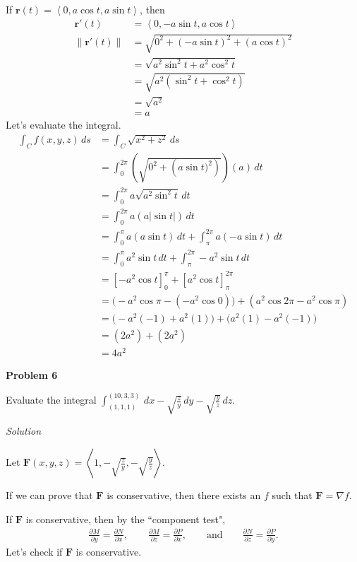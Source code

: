 \documentclass{article}
\newcommand{\lrp}[1]{\left( #1 \right)}
\newcommand{\lra}[1]{\left\langle #1 \right\rangle}
\newcommand{\lrb}[1]{\left[ #1 \right]}
\newcommand{\norm}[1]{\left\lVert #1 \right\rVert}
\renewcommand{\r}[0]{\mathbf{r}}
\newcommand{\F}[0]{\mathbf{F}}
\newcommand{\Solution}{\textit{Solution}}
\begin{document}
If $\r(t)=\lra{0,a\cos t,a\sin t}$, then
\begin{align*}
    \r'(t)&=\lra{0,-a\sin t, a\cos t}\\
    \norm{\r'(t)}&=\sqrt{0^2 + \lrp{-a\sin t}^2 +\lrp{a \cos t}^2}\\
    &=\sqrt{a^2\sin ^2 t+a^2\cos ^2 t}\\
    &=\sqrt{a^2\lrp{\sin ^2 t+\cos ^2 t}}\\
    &=\sqrt{a^2}\tag{$\sin ^2 t+\cos ^2 t=1$}\\
    &=a\tag{not $\left|a\right|$ since $a$ is radius of circle}
\end{align*}
Let's evaluate the integral.
\begin{align*}
    \int_C f(x,y,z)\,ds&=\int_C \sqrt{x^2+z^2}\,ds\\
    &=\int_0^{2\pi}\lrp{\sqrt{0^2+\lrp{a\sin t)^2}}}\lrp{a}\,dt\\
    &=\int_0^{2\pi}a\sqrt{a^2\sin^2 t}\,dt\\
    &=\int_0^{2\pi}a\lrp{a\left|\sin t\right|}\,dt\\
    &= \int_0^{\pi}a\lrp{a\sin t}\,dt+\int_{\pi}^{2\pi}a\lrp{-a\sin t}\,dt\tag{$\sin t\geq0$ when $0\leq t\leq \pi$, $\sin t\leq0$ when $\pi \leq t\leq 2\pi$}\\
    &=\int_0^\pi a^2\sin t\,dt+\int_{\pi}^{2\pi}-a^2\sin t\,dt\\
    &=\lrb{-a^2\cos t}_0^{\pi}+\lrb{a^2\cos t}_{\pi}^{2\pi}\\
    &=\Big(-a^2\cos \pi-\lrp{-a^2\cos 0}\Big)+\lrp{a^2\cos 2\pi -a^2\cos \pi}\\
    &=\Big(-a^2\lrp{-1}+a^2\lrp{1}\big)+\Big(a^2(1)-a^2(-1)\Big)\\
    &=\lrp{2a^2}+\lrp{2a^2}\\
    &=\boxed{4a^2}
\end{align*}

{}\textbf{Problem 6}

Evaluate the integral $\displaystyle \int_{(1,1,1)}^{(10,3,3)}\,dx-\sqrt{\frac{z}{y}}\,dy-\sqrt{\frac{y}{z}}\,dz$.

\Solution

Let $\displaystyle\F(x,y,z)=\lra{1,-\sqrt{\frac{z}{y}},-\sqrt{\frac{y}{z}}}$. 

If we can prove that $\F$ is conservative, then there exists an $f$ such that $\F=\nabla f$.

If $\F$ is conservative, then by the ``component test",
\begin{align*}
    \frac{\partial M}{\partial y}=\frac{\partial N}{\partial x},\hspace{2em}\frac{\partial M}{\partial z}=\frac{\partial P}{\partial x},\hspace{2em} \text{and}\hspace{2em}\frac{\partial N}{\partial z}=\frac{\partial P}{\partial y}.
\end{align*}
Let's check if $\F$ is conservative.
\end{document}
